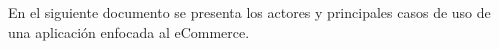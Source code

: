 \documentclass[letter]{article}
\begin{document}
	
	\begin{pregunta}{1} 
	
		En el siguiente documento se presenta los actores y principales casos de uso de una aplicación enfocada al eCommerce.
		
	\end{pregunta}
\end{document}
